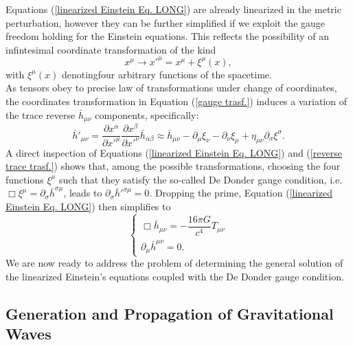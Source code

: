\documentclass[12pt,twoside,openany]{book}
\begin{document}
Equations (\ref{linearized Einstein Eq. LONG}) are already linearized in the metric perturbation, however they can be further simplified if we exploit the gauge freedom holding for the Einstein equations. This reflects the possibility of an infintesimal coordinate transformation of the kind
\begin{equation}
\label{gauge trasf.}
    x^\mu \rightarrow x'^\mu=x^\mu+\xi^\mu(x),
\end{equation}
with $\xi^\mu(x)$ denotingfour arbitrary functions of the spacetime.\\As tensors obey to precise law of transformations under change of coordinates, the coordinates transformation in Equation (\ref{gauge trasf.}) induces a variation of the trace reverse $\bar{h}_{\mu\nu}$ components, specifically:
\begin{equation}
\label{reverse trace trasf.}
    \bar{h}'_{\mu\nu}=\frac{\partial x^\alpha}{\partial x'^\mu}\frac{\partial x^\beta}{\partial x'^\nu}\bar{h}_{\alpha\beta}\approx \bar{h}_{\mu\nu}-\partial _\mu \xi_\nu -\partial_\nu \xi_\mu+\eta_{\mu\nu}\partial_\sigma\xi^\sigma.
\end{equation}
A direct inspection of Equations (\ref{linearized Einstein Eq. LONG}) and (\ref{reverse trace trasf.}) shows that, among the possible transformations, choosing the four functions $\xi^\mu$ such that they satisfy the so-called De Donder gauge condition, i.e. $\Box\xi^\mu=\partial_\sigma\bar{h}^{\sigma\mu}$, leads to $\partial_\sigma\bar{h}'^{\sigma\mu}=0$. Dropping the prime, Equation (\ref{linearized Einstein Eq. LONG}) then simplifies to
\begin{equation}\label{linearized Einstein eq + gauge condition} \begin{cases} \Box \bar{h}_{\mu\nu} = -\dfrac{16\pi G}{c^4} T_{\mu\nu} \\ \partial_\mu\bar{h}^{\mu\nu}=0. \end{cases} \end{equation}
We are now ready to address the problem of determining  the general solution of the linearized Einstein's equations coupled with the De Donder gauge condition. 








\subsection{Generation and Propagation of Gravitational Waves}
\end{document}

